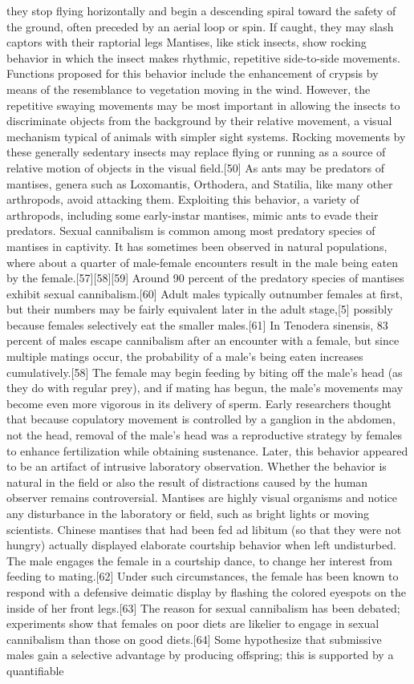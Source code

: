 \documentclass[twoside, 12pt, letterpaper]{report}\usepackage[]{graphicx}\usepackage[]{color}
\begin{document}
\begin{multicols*}{2}
they stop flying horizontally and begin a descending spiral toward the safety of the ground, often preceded by an aerial loop or spin. If caught, they may slash captors with their raptorial legs Mantises, like stick insects, show rocking behavior in which the insect makes rhythmic, repetitive side-to-side movements. Functions proposed for this behavior include the enhancement of crypsis by means of the resemblance to vegetation moving in the wind. However, the repetitive swaying movements may be most important in allowing the insects to discriminate objects from the background by their relative movement, a visual mechanism typical of animals with simpler sight systems. Rocking movements by these generally sedentary insects may replace flying or running as a source of relative motion of objects in the visual field.[50] As ants may be predators of mantises, genera such as Loxomantis, Orthodera, and Statilia, like many other arthropods, avoid attacking them. Exploiting this behavior, a variety of arthropods, including some early-instar mantises, mimic ants to evade their predators. Sexual cannibalism is common among most predatory species of mantises in captivity. It has sometimes been observed in natural populations, where about a quarter of male-female encounters result in the male being eaten by the female.[57][58][59] Around 90 percent of the predatory species of mantises exhibit sexual cannibalism.[60] Adult males typically outnumber females at first, but their numbers may be fairly equivalent later in the adult stage,[5] possibly because females selectively eat the smaller males.[61] In Tenodera sinensis, 83 percent of males escape cannibalism after an encounter with a female, but since multiple matings occur, the probability of a male's being eaten increases cumulatively.[58] The female may begin feeding by biting off the male's head (as they do with regular prey), and if mating has begun, the male's movements may become even more vigorous in its delivery of sperm. Early researchers thought that because copulatory movement is controlled by a ganglion in the abdomen, not the head, removal of the male's head was a reproductive strategy by females to enhance fertilization while obtaining sustenance. Later, this behavior appeared to be an artifact of intrusive laboratory observation. Whether the behavior is natural in the field or also the result of distractions caused by the human observer remains controversial. Mantises are highly visual organisms and notice any disturbance in the laboratory or field, such as bright lights or moving scientists. Chinese mantises that had been fed ad libitum (so that they were not hungry) actually displayed elaborate courtship behavior when left undisturbed. The male engages the female in a courtship dance, to change her interest from feeding to mating.[62] Under such circumstances, the female has been known to respond with a defensive deimatic display by flashing the colored eyespots on the inside of her front legs.[63] The reason for sexual cannibalism has been debated; experiments show that females on poor diets are likelier to engage in sexual cannibalism than those on good diets.[64] Some hypothesize that submissive males gain a selective advantage by producing offspring; this is supported by a quantifiable 
\end{multicols*}
\end{document}

